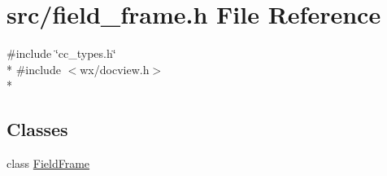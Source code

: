 \hypertarget{a00227}{\section{src/field\-\_\-frame.h File Reference}
\label{a00227}
}
{\ttfamily \#include \char`\"{}cc\-\_\-types.\-h\char`\"{}}\\*
{\ttfamily \#include $<$wx/docview.\-h$>$}\\*
\subsection*{Classes}
\begin{DoxyCompactItemize}
\item 
class \hyperlink{a00102}{Field\-Frame}
\end{DoxyCompactItemize}
